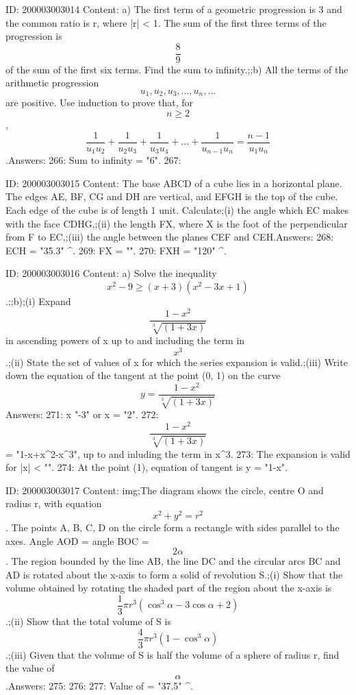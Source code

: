 \documentclass{article}
\begin{document}
ID: 200003003014
Content:
a) The first term of a geometric progression is 3 and the common ratio is r, where |r| < 1. The sum of the first three terms of the progression is \[\frac{8}{9}\] of the sum of the first six terms. Find the sum to infinity.;;b) All the terms of the arithmetic progression \[u_{1}, u_{2}, u_{3},..., u_{n},...\] are positive. Use induction to prove that, for  \[n \geq 2\], \[\frac{1}{u_{1}u_{2}} + \frac{1}{u_{2}u_{3}} + \frac{1}{u_{3}u_{4}} + ... + \frac{1}{u_{n-1}u_{n}} = \frac{n - 1}{u_{1}u_{n}}\].Answers:
266: Sum to infinity = "6".
267: 

ID: 200003003015
Content:
The base ABCD of a cube lies in a horizontal plane. The edges AE, BF, CG and DH are vertical, and EFGH is the top of the cube. Each edge of the cube is of length 1 unit. Calculate;(i) the angle which EC makes with the face CDHG,;(ii) the length FX, where X is the foot of the perpendicular from F to EC,;(iii) the angle between the planes CEF and CEH.Answers:
268: \angle ECH = "35.3" ^{\circ}.
269: FX = "".
270: \angle FXH = "120" ^{\circ}.

ID: 200003003016
Content:
a) Solve the inequality \[x^2 - 9 \geq (x + 3) (x^2 -3x + 1)\].;;b);(i) Expand \[\frac{1 - x^2}{\sqrt[3]{(1 + 3x)}}\] in ascending powers of x up to and including the term in \[x^3\].;(ii) State the set of values of x for which the series expansion is valid.;(iii) Write down the equation of the tangent at the point (0, 1) on the curve \[y = \frac{1 - x^2}{\sqrt[3]{(1 + 3x)}}\]Answers:
271: x \leq "-3" or x = "2".
272:  \[\frac{1 - x^2}{\sqrt[3]{(1 + 3x)}}\] = "1-x+x^2-x^3", up to and inluding the term in x^3.
273: The expansion is valid for |x| < "".
274: At the point (1), equation of tangent is y = "1-x".

ID: 200003003017
Content:
img;The diagram shows the circle, centre O and radius r, with equation \[x^2 + y^2 = r^2\]. The points A, B, C, D on the circle form a rectangle with sides parallel to the axes. Angle AOD = angle BOC = \[2\alpha\]. The region bounded by the line AB, the line DC and the circular arcs BC and AD is rotated about the x-axis to form a solid of revolution S.;(i) Show that the volume obtained by rotating the shaded part of the region about the x-axis is \[\frac{1}{3} \pi r^3 (\cos^3 \alpha - 3\cos \alpha + 2)\].;(ii) Show that the total volume of S is \[\frac{4}{3} \pi r^3 (1 - \cos^3 \alpha)\].;(iii) Given that the volume of S is half the volume of a sphere of radius r, find the value of \[\alpha\].Answers:
275: 
276: 
277: Value of \alpha = "37.5" { }^{\circ}.
\end{document}
